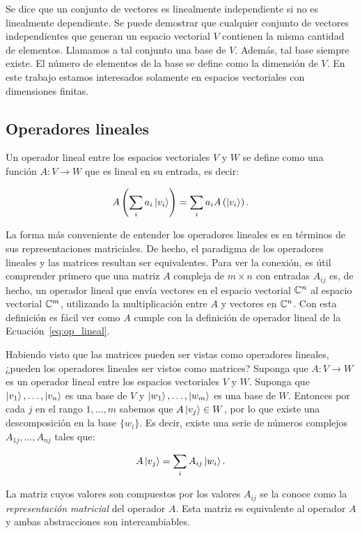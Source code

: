 Se dice que un conjunto de vectores es linealmente independiente si no es linealmente dependiente. Se puede demostrar que cualquier conjunto de vectores independientes que generan un espacio vectorial $V$ contienen la misma cantidad de elementos. Llamamos a tal conjunto una base de $V$. Además, tal base siempre existe. El número de elementos de la base se define como la dimensión de $V$. En este trabajo estamos interesados solamente en espacios vectoriales con dimensiones finitas.

\subsection{Operadores lineales}
Un operador lineal entre los espacios vectoriales $V$ y $W$ se define como una función $A: V \rightarrow W$ que es lineal en su entrada, es decir:

\begin{equation}\label{eq:op_lineal}
    A\left(\sum_i a_i\ket{v_i}\right) = \sum_i a_i A \left(\ket{v_i}\right).
\end{equation}

La forma más conveniente de entender los operadores lineales es en términos de sus representaciones matriciales. De hecho, el paradigma de los operadores lineales y las matrices resultan ser equivalentes. Para ver la conexión, es útil comprender primero que una matriz $A$ compleja de $m\times n$ con entradas $A_{ij}$ es, de hecho, un operador lineal que envía vectores en el espacio vectorial $\mathbb{C}^n$ al espacio vectorial $\mathbb{C}^m$, utilizando la multiplicación entre $A$ y vectores en $\mathbb{C}^n$. Con esta definición es fácil ver como $A$ cumple con la definición de operador lineal de la Ecuación~\ref{eq:op_lineal}.

Habiendo visto que las matrices pueden ser vistas como operadores lineales, ¿pueden los operadores lineales ser vistos como matrices? Suponga que $A: V \rightarrow W$ es un operador lineal entre los espacios vectoriales $V$ y $W$. Suponga que $\ket{v_1}, \dots, \ket{v_n}$ es una base de $V$ y $\ket{w_1}, \dots, \ket{w_m}$ es una base de $W$. Entonces por cada $j$ en el rango $1, \dots, m$ sabemos que $A\ket{v_j}\in W$, por lo que existe una descomposición en la base $\{w_i\}$. Es decir, existe una serie de números complejos $A_{1j}, \dots, A_{nj}$ tales que:

\[A\ket{v_j} = \sum_i A_{ij} \ket{w_i}.\]

La matriz cuyos valores son compuestos por los valores $A_{ij}$ se la conoce como la \emph{representación matricial} del operador $A$. Esta matriz es equivalente al operador $A$ y ambas abstracciones son intercambiables.

